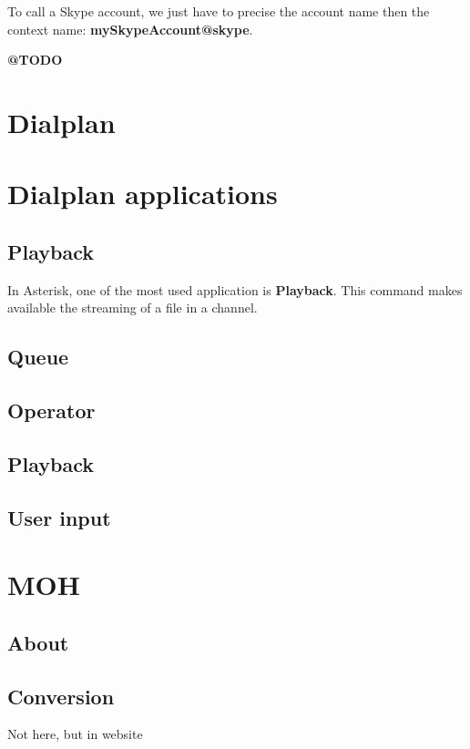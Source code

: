 To call a Skype account, we just have to precise the account name then the context name: \textbf{mySkypeAccount@skype}. 


\textbf{@TODO}

\section{Dialplan}



\section{Dialplan applications}
\subsection{Playback}
In Asterisk, one of the most used application is \textbf{Playback}. This command makes available the streaming of a file in a channel.


\subsection{Queue}
\subsection{Operator}
\subsection{Playback}
\subsection{User input}




\section{MOH}
\subsection{About}
\subsection{Conversion}
Not here, but in website 